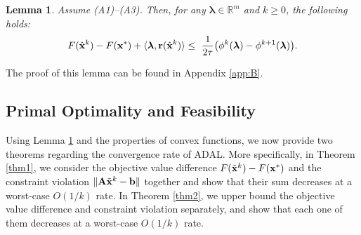 \documentclass[doublecolumn]{IEEEtran}
\newtheorem{lem}{\bf \noindent Lemma}
\begin{document}
\begin{lem}\label{lemma3}
Assume (A1)--(A3). Then, for any ${\boldsymbol{\lambda}} \in \mathbb{R}^m$ and $k \ge 0$, the following holds:
\begin{align*}
F({\hat{\mathbf x}}^k) -  F({ {\bf x} }^*) + \langle {\boldsymbol{\lambda}}, { {\bf r} }({\hat{\mathbf x}}^k)\rangle
\leq~
\frac{1}{2\tau}\big( \phi^k({\boldsymbol{\lambda}}) - \phi^{k+1}({\boldsymbol{\lambda}}) \big).
\end{align*}
\end{lem}
The proof of this lemma can be found in Appendix \ref{app:B}.

\subsection{Primal Optimality and Feasibility}
Using Lemma \ref{lemma3} and the properties of convex functions, we now provide two theorems regarding the convergence rate of ADAL.
More specifically, in Theorem \ref{thm1},
we consider the objective value difference $F({ \tilde{\bf x} }^k)-F({ {\bf x} }^*)$ and the constraint violation $\| { {\bf A} } { \tilde{\bf x} }^k - \bf b\|$ together and show that their sum decreases at a worst-case $O(1/k)$ rate.
In Theorem \ref{thm2}, we upper bound the objective value difference and constraint violation separately, and show that each one of them decreases at a worst-case $O(1/k)$ rate.
\end{document}
